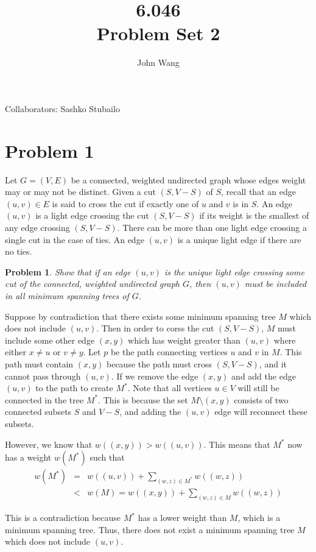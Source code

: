 \documentclass[psamsfonts]{amsart}
\title{6.046 \\
Problem Set 2}
\author{John Wang}
\newtheorem{prob}{Problem}[section]
\newenvironment{sol}{{\bfseries Solution}}{\qedsymbol}
\theoremstyle{definition}
\theoremstyle{remark}
\numberwithin{equation}{section}
\begin{document}
\maketitle

Collaborators: Sashko Stubailo

\section{Problem 1}
Let $G = (V,E)$ be a connected, weighted undirected graph whose edges weight may or may not
be distinct. Given a cut $(S, V - S)$ of $S$, recall that an edge $(u, v) \in E$ is said to cross the cut
if exactly one of $u$ and $v$ is in $S$. An edge $(u, v)$ is a light edge crossing the cut $(S, V - S)$ if its
weight is the smallest of any edge crossing $(S, V - S)$. There can be more than one light edge
crossing a single cut in the case of ties. An edge $(u, v)$ is a unique light edge if there are no ties.

\begin{prob}
Show that if an edge $(u, v)$ is the unique light edge crossing some cut of the connected,
weighted undirected graph $G$, then $(u, v)$ must be included in all minimum spanning
trees of $G$.
\end{prob}

\begin{sol}
Suppose by contradiction that there exists some minimum spanning tree $M$ which does not include $(u,v)$. Then in order to corss the cut $(S, V - S)$, $M$ must include some other edge $(x,y)$ which has weight greater than $(u,v)$ where either $x \neq u$ or $v \neq y$. Let $p$ be the path connecting vertices $u$ and $v$ in $M$. This path must contain $(x,y)$ because the path must cross $(S, V - S)$, and it cannot pass through $(u,v)$. If we remove the edge $(x,y)$ and add the edge $(u,v)$ to the path to create $M^*$. Note that all vertices $u \in V$ will still be connected in the tree $M^*$. This is because the set $M \setminus (x,y)$ consists of two connected subsets $S$ and $V - S$, and adding the $(u,v)$ edge will reconnect these subsets.

However, we know that $w((x,y)) > w((u,v))$. This means that $M^*$ now has a weight $w(M^*)$ such that 
\begin{eqnarray}
w(M^*) &=& w((u,v)) + \sum_{(w,z) \in M^{*}} w((w,z)) \\
&<& w(M) = w((x,y)) + \sum_{(w,z) \in M} w((w,z))
\end{eqnarray}

This is a contradiction because $M^*$ has a lower weight than $M$, which is a minimum spanning tree. Thus, there does not exist a minimum spanning tree $M$ which does not include $(u,v)$. 
\end{sol}
\end{document}

